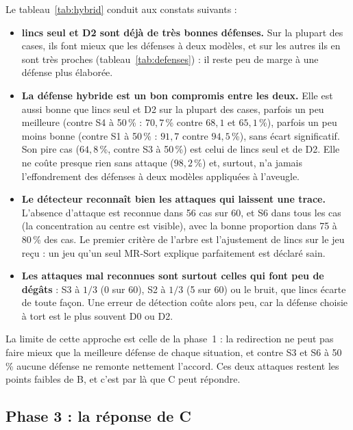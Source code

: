 \documentclass[11pt,a4paper]{article}
\begin{document}
Le tableau~\ref{tab:hybrid} conduit aux constats suivants :
\begin{itemize}
  \item \textbf{lincs seul et D2 sont déjà de très bonnes défenses.} Sur la plupart des cases, ils font mieux que les
        défenses à deux modèles, et sur les autres ils en sont très proches (tableau~\ref{tab:defenses}) : il reste
        peu de marge à une défense plus élaborée.
  \item \textbf{La défense hybride est un bon compromis entre les deux.} Elle est aussi bonne que lincs seul et D2 sur
        la plupart des cases, parfois un peu meilleure (contre S4 à 50\,\% : $70{,}7$\,\% contre $68{,}1$ et
        $65{,}1$\,\%), parfois un peu moins bonne (contre S1 à 50\,\% : $91{,}7$ contre $94{,}5$\,\%), sans écart
        significatif. Son pire cas ($64{,}8$\,\%, contre S3 à 50\,\%) est celui de lincs seul et de D2. Elle ne coûte
        presque rien sans attaque ($98{,}2$\,\%) et, surtout, n'a jamais l'effondrement des défenses à deux modèles
        appliquées à l'aveugle.
  \item \textbf{Le détecteur reconnaît bien les attaques qui laissent une trace.} L'absence d'attaque est reconnue
        dans 56 cas sur 60, et S6 dans tous les cas (la concentration au centre est visible), avec la bonne proportion
        dans 75 à 80\,\% des cas. Le premier critère de l'arbre est l'ajustement de lincs sur le jeu reçu : un jeu qu'un
        seul MR-Sort explique parfaitement est déclaré sain.
  \item \textbf{Les attaques mal reconnues sont surtout celles qui font peu de dégâts} : S3 à $1/3$ (0 sur 60), S2 à
        $1/3$ (5 sur 60) ou le bruit, que lincs écarte de toute façon. Une erreur de détection coûte alors peu, car
        la défense choisie à tort est le plus souvent D0 ou D2.
\end{itemize}
La limite de cette approche est celle de la phase~1 : la redirection ne peut pas faire mieux que la meilleure
défense de chaque situation, et contre S3 et S6 à 50\,\% aucune défense ne remonte nettement l'accord. Ces deux
attaques restent les points faibles de B, et c'est par là que C peut répondre.

\subsection{Phase 3 : la réponse de C}
\end{document}
